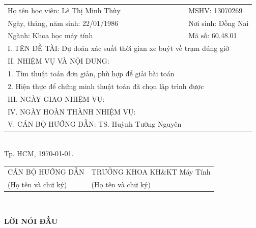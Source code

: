 \documentclass[a4paper, 13pt]{report}
\begin{document}
\begin{tabular}{ ll}
\vspace*{0.1cm}Họ tên học viên: Lê Thị Minh Thùy&\vspace*{0.1cm} MSHV: 13070269\\
\vspace*{0.1cm} Ngày, tháng, năm sinh: 22/01/1986 &\vspace*{0.1cm} Nơi sinh: Đồng Nai\\
\vspace*{0.1cm} Ngành: Khoa học máy tính & \vspace*{0.1cm} Mã số: 60.48.01\\
\multicolumn{2}{l}{\vspace*{1cm}I. TÊN ĐỀ TÀI: Dự đoán xác suất thời gian xe buýt về trạm đúng giờ} \\
\vspace*{0.1cm} II.  NHIỆM VỤ VÀ NỘI DUNG: \\
\multicolumn{2}{l}{\vspace*{0.1cm}1. Tìm thuật toán đơn giản, phù hợp để giải bài toán} \\
\multicolumn{2}{l}{\vspace*{3cm}2. Hiện thực để chứng minh thuật toán đã chọn lập trình được} \\

\vspace*{0.1cm} III.  NGÀY GIAO NHIỆM VỤ: & \\
\vspace*{0.1cm} IV.  NGÀY HOÀN THÀNH NHIỆM VỤ: & \\
\vspace*{0.1cm}V. CÁN BỘ HƯỚNG DẪN: TS. Huỳnh Tường Nguyên & \\
\end{tabular}\\
\vspace*{1cm}
\hfill Tp. HCM, \today. 
\begin{tabular}{ p{7cm}p{9cm}}
 \hspace{1cm} CÁN BỘ HƯỚNG DẪN & TRƯỞNG KHOA KH$\&$KT Máy Tính\\
 \hspace{1cm}  (Họ tên và chữ ký) & (Họ tên và chữ ký)\\
\end{tabular}\\
\pagebreak
\begin{center}{\fontsize{16pt}{1}\selectfont \textbf{LỜI NÓI ĐẦU}}\\\end{center}
\end{document}
